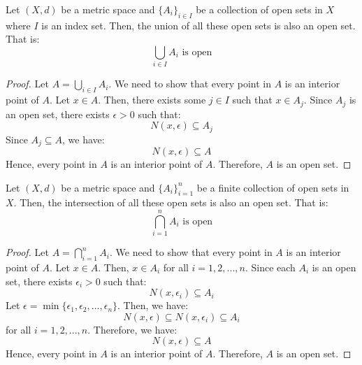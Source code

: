 \documentclass[openany]{book}
\begin{document}
\begin{mytheorem}
    Let $(X, d)$ be a metric space and $\{A_i\}_{i \in I}$ be a collection of open sets in $X$ where $I$ is an index set. Then, the union of all these open sets is also an open set. That is:
    $$\bigcup_{i \in I} A_i \text{ is open}$$
\end{mytheorem}
\begin{proof}
    Let $A = \bigcup_{i \in I} A_i$. We need to show that every point in $A$ is an interior point of $A$. Let $x \in A$. Then, there exists some $j \in I$ such that $x \in A_j$. Since $A_j$ is an open set, there exists $\epsilon > 0$ such that:
    $$N(x, \epsilon) \subseteq A_j$$
    Since $A_j \subseteq A$, we have:
    $$N(x, \epsilon) \subseteq A$$
    Hence, every point in $A$ is an interior point of $A$. Therefore, $A$ is an open set.
\end{proof}
\begin{mytheorem}
    Let $(X, d)$ be a metric space and $\{A_i\}_{i=1}^{n}$ be a finite collection of open sets in $X$. Then, the intersection of all these open sets is also an open set. That is:
    $$\bigcap_{i=1}^{n} A_i \text{ is open}$$
\end{mytheorem}
\begin{proof}
    Let $A = \bigcap_{i=1}^{n} A_i$. We need to show that every point in $A$ is an interior point of $A$. Let $x \in A$. Then, $x \in A_i$ for all $i = 1, 2, ..., n$. Since each $A_i$ is an open set, there exists $\epsilon_i > 0$ such that:
    $$N(x, \epsilon_i) \subseteq A_i$$
    Let $\epsilon = \min\{\epsilon_1, \epsilon_2, ..., \epsilon_n\}$. Then, we have:
    $$N(x, \epsilon) \subseteq N(x, \epsilon_i) \subseteq A_i$$
    for all $i = 1, 2, ..., n$. Therefore, we have:
    $$N(x, \epsilon) \subseteq A$$
    Hence, every point in $A$ is an interior point of $A$. Therefore, $A$ is an open set.
\end{proof}
\end{document}
